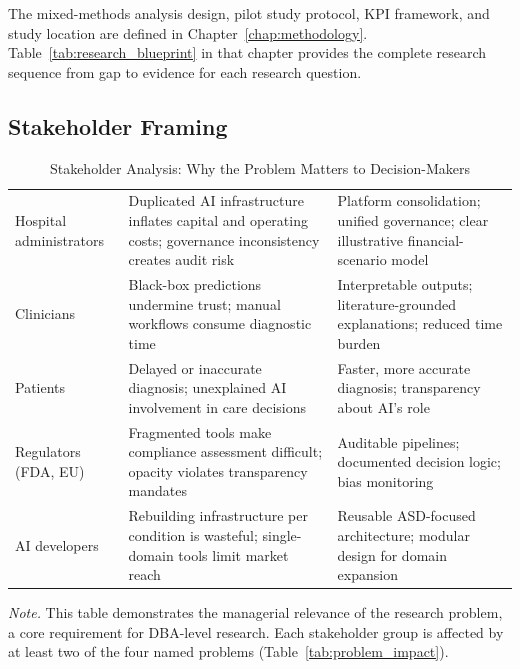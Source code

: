 \noindent The mixed-methods analysis design, pilot study protocol, KPI framework, and study location are defined in Chapter~\ref{chap:methodology}. Table~\ref{tab:research_blueprint} in that chapter provides the complete research sequence from gap to evidence for each research question.

\subsection{Stakeholder Framing}
\label{sec:stakeholders}

{\tablestripes\tablefontsize
{}
\begin{xltabular}{\textwidth}{@{} >{\raggedright\arraybackslash}p{2.6cm} p{6.2cm} p{5.5cm} @{}}
\caption[Stakeholder Analysis]{Stakeholder Analysis: Why the Problem Matters to Decision-Makers}\label{tab:stakeholder_analysis} \\
\toprule
{} &  &  \\
\midrule
\endfirsthead
\endhead
\bottomrule
\endlastfoot
Hospital administrators & Duplicated AI infrastructure inflates capital and operating costs; governance inconsistency creates audit risk & Platform consolidation; unified governance; clear illustrative financial-scenario model \\
\addlinespace
Clinicians & Black-box predictions undermine trust; manual workflows consume diagnostic time & Interpretable outputs; literature-grounded explanations; reduced time burden \\
\addlinespace
Patients & Delayed or inaccurate diagnosis; unexplained AI involvement in care decisions & Faster, more accurate diagnosis; transparency about AI's role \\
\addlinespace
Regulators (FDA, EU) & Fragmented tools make compliance assessment difficult; opacity violates transparency mandates & Auditable pipelines; documented decision logic; bias monitoring \\
\addlinespace
AI developers & Rebuilding infrastructure per condition is wasteful; single-domain tools limit market reach & Reusable ASD-focused architecture; modular design for domain expansion \\
\end{xltabular}}
\vspace{0.5em}
\noindent\textit{Note.} This table demonstrates the managerial relevance of the research problem, a core requirement for DBA-level research. Each stakeholder group is affected by at least two of the four named problems (Table~\ref{tab:problem_impact}).

